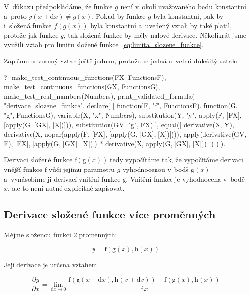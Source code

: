 V~důkazu předpokládáme, že funkce \(g\) není v~okolí uvažovaného bodu konstantní a~proto \(g(x + \mathrm{d}x) \neq g(x)\). Pokud by funkce  \(g\) byla konstantní, pak by i~složená funkce \(f(g(x))\) byla konstantní a~uvedený vztah by také platil, protože jak funkce \(g\), tak složená funkce by měly nulové derivace. Několikrát jsme využili vztah pro limitu složené funkce~\eqref{eq:limita_slozene_funkce}.

Zapišme odvozený vztah ještě jednou, protože se jedná o~velmi důležitý vztah:

\begin{fact}
\begin{prolog}
?-	make_test_continuous_functions(FX, FunctionsF),
	make_test_continuous_functions(GX, FunctionsG),
	make_test_real_numbers(Numbers),
	print_validated_formula(
		"derivace_slozene_funkce",
		declare(
			[
				function(F, "f", FunctionsF),
				function(G, "g", FunctionsG),
				variable(X, "x", Numbers),
				substitution(Y, "y", apply(F, [FX], [apply(G, [GX], [X])])),
				substitution(GV, "g", FX)   %
			],
			equal([
				derivative(X, Y),
				derivative(X, nopar(apply(F, [FX], [apply(G, [GX], [X])]))),
				apply(derivative(GV, F), [FX], [apply(G, [GX], [X])]) * derivative(X, apply(G, [GX], [X]))
			])
		)
	).
\end{prolog}
\end{fact}

Derivaci složené funkce \(\mathrm{f}(\mathrm{g}(x))\) tedy vypočítáme tak, že vypočítáme derivaci vnější funkce \(\mathrm{f}\) vůči jejímu parametru \(g\) vyhodnocenou v~bodě \(\mathrm{g}(x)\) a~vynásobíme ji derivací vnitřní funkce \(\mathrm{g}\). Vnitřní funkce je vyhodnocena v~bodě \(x\), ale to není nutné explicitně zapisovat.

\subsection{Derivace složené funkce více proměnných}

Mějme složenou funkci 2 proměnných:

\begin{equation}
y = \mathrm{f}(\mathrm{g}(x), \mathrm{h}(x))
\end{equation}

Její derivace je určena vztahem

\begin{equation}
\frac{\partial y}{\partial x} = \lim_{\mathrm{d}x \to 0} \frac{\mathrm{f}(\mathrm{g}(x + \mathrm{d}x), \mathrm{h}(x + \mathrm{d}x)) - \mathrm{f}(\mathrm{g}(x), \mathrm{h}(x))}{\mathrm{d}x}
\end{equation}

